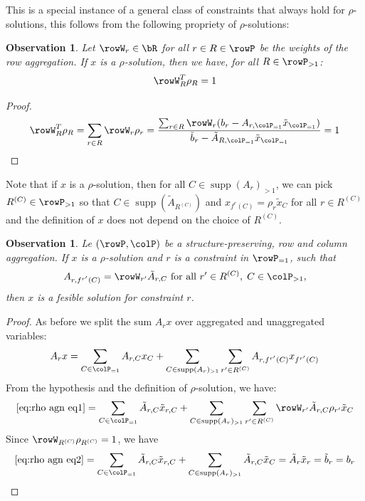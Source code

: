 \documentclass[smallextended,natbib]{svjour3}       %
\newtheorem{observation}[theorem]{Observation}
\DeclareMathOperator{\supp}{supp}
\numberwithin{theorem}{section}
\begin{document}
This is a special instance of a general class of constraints that always hold for \(\rho\)-solutions, this follows from the following propriety of \(\rho\)-solutions:

\begin{observation}
  \label{ob:rhoconvex}
  Let \(\rowW_r \in \bR\) for all \(r \in R \in \rowP\) be the weights of the row aggregation.
  If \(x\) is a \(\rho\)-solution, then we have, for all \(R \in \rowP_{>1}\):
  \begin{equation}
    \rowW_R^T \rho_R = 1
  \end{equation}
\end{observation}
\begin{proof}
  \[
  \rowW_R^T \rho_R = \sum_{r \in R} \rowW_r \rho_r =  \frac{\sum_{r \in R}\rowW_r(b_r - A_{r, \colP_{=1}} \tilde{x}_{\colP_{=1}})}{\tilde{b}_r
  - \tilde{A}_{R, \colP_{=1}} \tilde{x}_{\colP_{=1}}} = 1
  \] 
\end{proof}
Note that if \(x\) is a \(\rho\)-solution, then for all \(C \in \supp(A_{r})_{>1}\), we can pick \(R^{(C)} \in \rowP_{>1}\) so that \(C \in \supp(\tilde{A}_{R^{(C)}})\) and \(x_{f^r(C)} = \rho_r \tilde{x}_C\) for all \(r \in R^{(C)}\) and the definition of \(x\) does not depend on the choice of \(R^{(C)}\).
\begin{observation}
  Le \((\rowP,\colP)\) be a structure-preserving, row and column aggregation. If \(x\) is a \(\rho\)-solution and \(r\) is a constraint in \(\rowP_{=1}\), such that 
  \[A_{r,f^{r'}(C)} = \rowW_{r'}\tilde{A}_{r,C} \text{ for all } r' \in R^{(C)},\; C \in \colP_{>1}, \]
  then \(x\) is a fesible solution for constraint \(r\).
\end{observation}

\begin{proof}
As before we split the sum \(A_rx\) over aggregated and unaggregated variables:
\begin{equation}
  \label{eq:rho agn eq1}
  A_rx = \sum_{C \in \colP_{=1}}A_{r,C}x_{C} +  \sum_{C \in \supp(A_{r})_{>1}} \sum_{r' \in R^{(C)}} A_{r,f^{r'}(C)}x_{f^{r'}(C)}
\end{equation}
From the hypothesis and the definition of \(\rho\)-solution, we have:
\begin{equation}
  \label{eq:rho agn eq2}
    \eqref{eq:rho agn eq1} =  \sum_{C \in \colP_{=1}}\tilde{A}_{r,C}\tilde{x}_{r,C} +  \sum_{C \in \supp(A_{r})_{>1}} \sum_{r' \in R^{(C)}}\rowW_{r'} \tilde{A}_{r,C}\rho_{r'}\tilde{x}_{C} 
\end{equation}
Since \(\rowW_{R^{(C)}} \rho_{R^{(C)}} = 1\), we have
\begin{equation}
  \label{eq:rho agn eq3}
    \eqref{eq:rho agn eq2} =   \sum_{C \in \colP_{=1}}\tilde{A}_{r,C}\tilde{x}_{r,C} +  \sum_{C \in \supp(A_{r})_{>1}}\tilde{A}_{r,C}\tilde{x}_{C} = \tilde{A}_r\tilde{x}_r = \tilde{b}_r = b_r
\end{equation}
\end{proof}
\end{document}
